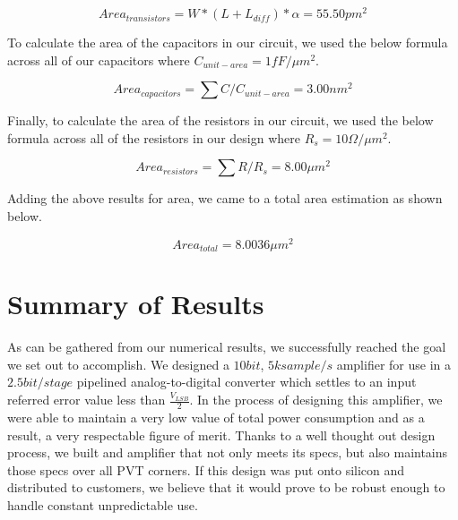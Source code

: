 \documentclass[journal]{IEEEtran}
\begin{document}
\begin{equation}
Area_{transistors} = W*(L+L_{diff})*\alpha = 55.50 pm^2
\end{equation}

To calculate the area of the capacitors in our circuit, we used the below formula across all of our capacitors where $C_{unit-area} = 1fF/\mu m^2$.

\begin{equation}
Area_{capacitors} = \sum{C/C_{unit-area}} = 3.00 nm^2
\end{equation}

Finally, to calculate the area of the resistors in our circuit, we used the below formula across all of the resistors in our design where $R_s = 10\Omega / \mu m^2$.

\begin{equation}
Area_{resistors} = \sum{R/R_s} = 8.00 \mu m^2
\end{equation}

Adding the above results for area, we came to a total area estimation as shown below.

\begin{equation}
Area_{total} = 8.0036 \mu m^2
\end{equation}

\section{Summary of Results}
As can be gathered from our numerical results, we successfully reached the goal we set out to accomplish. We designed a $10bit$, $5k sample/s$ amplifier for use in a $2.5bit/stage$ pipelined analog-to-digital converter which settles to an input referred error value less than $\frac{V_{LSB}}{2}$. In the process of designing this amplifier, we were able to maintain a very low value of total power consumption and as a result, a very respectable figure of merit. Thanks to a well thought out design process, we built and amplifier that not only meets its specs, but also maintains those specs over all PVT corners. If this design was put onto silicon and distributed to customers, we believe that it would prove to be robust enough to handle constant unpredictable use.
\end{document}
